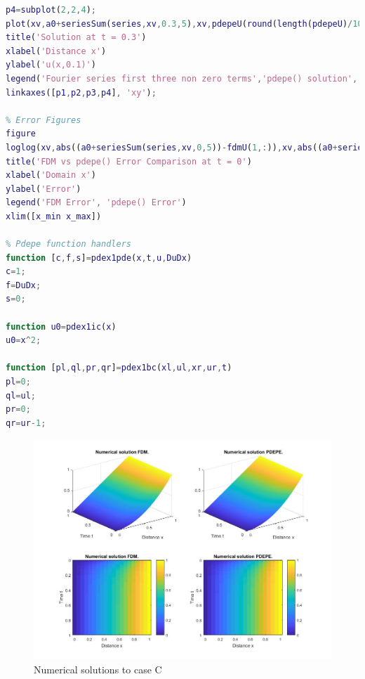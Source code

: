 \documentclass{article}
\begin{document}
\begin{lstlisting}[language=Matlab]
p4=subplot(2,2,4);
plot(xv,a0+seriesSum(series,xv,0.3,5),xv,pdepeU(round(length(pdepeU)/10)*3,:),'-.',xv,fdmU(round(length(fdmU)/10)*3,:),'*')
title('Solution at t = 0.3')
xlabel('Distance x')
ylabel('u(x,0.1)')
legend('Fourier series first three non zero terms','pdepe() solution','Finite Difference method')
linkaxes([p1,p2,p3,p4], 'xy');

% Error Figures
figure
loglog(xv,abs((a0+seriesSum(series,xv,0,5))-fdmU(1,:)),xv,abs((a0+seriesSum(series,xv,0,5))-pdepeU(2,:)));
title('FDM vs pdepe() Error Comparison at t = 0')
xlabel('Domain x')
ylabel('Error')
legend('FDM Error', 'pdepe() Error')
xlim([x_min x_max])

% Pdepe function handlers
function [c,f,s]=pdex1pde(x,t,u,DuDx)
c=1;
f=DuDx;
s=0;

function u0=pdex1ic(x)
u0=x^2;

function [pl,ql,pr,qr]=pdex1bc(xl,ul,xr,ur,t)
pl=0;
ql=ul;
pr=0;
qr=ur-1;
\end{lstlisting}
\begin{figure}
	\begin{center}
		\includegraphics[width=\textwidth,height=\textheight,keepaspectratio]{MATLAB/C1.jpg}
	\end{center}
	\caption{Numerical solutions to case C}
\end{figure}
\end{document}
